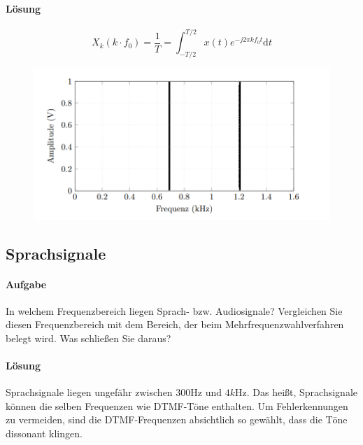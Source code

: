 \documentclass[10pt]{scrreprt}
\begin{document}
        \paragraph{Lösung}
        \begin{equation*}
            X_k (k \cdot f_0) = \frac{1}{T} = \int_{-T/2}^{T/2} x(t) e^{-j 2 \pi k f_0 t} \text{d}t
        \end{equation*}

        \begin{center}
            \begin{figure}[H]
                \includegraphics[width=\textwidth]{vorbereitenderBullshit3.png}
            \end{figure}
        \end{center}

        \subsection{Sprachsignale}
        \paragraph{Aufgabe}
        In welchem Frequenzbereich liegen Sprach- bzw. Audiosignale? Vergleichen Sie diesen
        Frequenzbereich mit dem Bereich, der beim Mehrfrequenzwahlverfahren belegt wird. Was
        schließen Sie daraus?

        \paragraph{Lösung}
        Sprachsignale liegen ungefähr zwischen $300\si{\hertz}$ und $4\si{k\hertz}$.
        Das heißt, Sprachsignale können die selben Frequenzen wie DTMF-Töne enthalten.
        Um Fehlerkennungen zu vermeiden, sind die DTMF-Frequenzen absichtlich so
        gewählt, dass die Töne dissonant klingen.
\end{document}
